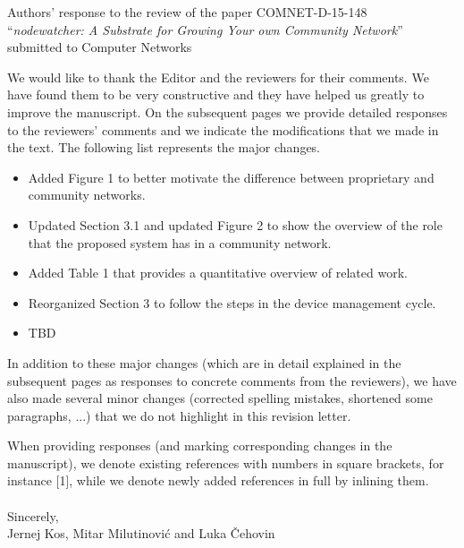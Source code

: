\documentclass[12pt,twoside,a4paper]{report}
\newcommand{\nodewatcher}{\textit{nodewatcher}}
\begin{document}
\pagestyle{empty}
\begin{center} {\Large{Authors' response to the review of the paper COMNET-D-15-148}}\\
    ``\emph{\nodewatcher{}: A Substrate for Growing Your own Community Network}''\\
    submitted to Computer Networks
\end{center}

\noindent We would like to thank the Editor and the reviewers for their comments. We have found them to be very constructive and they have helped us greatly to improve the manuscript. On the subsequent pages we provide detailed responses to the reviewers' comments and we indicate the modifications that we made in the text. The following list represents the major changes.
\begin{itemize}
\item Added Figure 1 to better motivate the difference between proprietary and community networks.
\item Updated Section 3.1 and updated Figure 2 to show the overview of the role that the proposed system has in a community network.
\item Added Table 1 that provides a quantitative overview of related work.
\item Reorganized Section 3 to follow the steps in the device management cycle.
\item TBD
\end{itemize}

\noindent In addition to these major changes (which are in detail explained in the subsequent pages as responses to concrete comments from the reviewers), we have also made several minor changes (corrected spelling mistakes, shortened some paragraphs, ...) that we do not highlight in this revision letter.

\noindent When providing responses (and marking corresponding changes in the manuscript), we denote existing references with numbers in square brackets, for instance [1], while we denote newly added references in full by inlining them.\\
\\
\noindent Sincerely,\\
Jernej Kos, Mitar Milutinović and Luka Čehovin

\newpage
\end{document}
